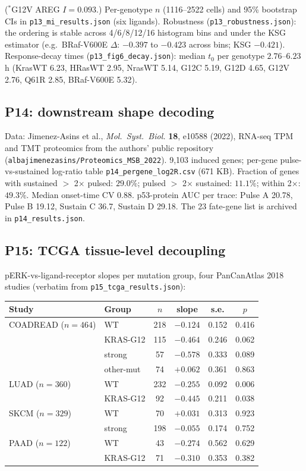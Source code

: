 \documentclass[11pt]{article}
\begin{document}
($^*$G12V AREG $I=0.093$.) Per-genotype $n$ (1116--2522 cells) and 95\%
bootstrap CIs in \texttt{p13\_mi\_results.json} (six ligands).
Robustness (\texttt{p13\_robustness.json}): the ordering is stable across
4/6/8/12/16 histogram bins and under the KSG estimator (e.g.\ BRaf-V600E
$\Delta$: $-0.397$ to $-0.423$ across bins; KSG $-0.421$).
Response-decay times (\texttt{p13\_fig6\_decay.json}): median $t_0$ per
genotype $2.76$--$6.23$ h (KrasWT 6.23, HRasWT 2.95, NrasWT 5.14, G12C
5.19, G12D 4.65, G12V 2.76, Q61R 2.85, BRaf-V600E 5.32).

\subsection{P14: downstream shape decoding}

Data: Jimenez-Asins et al., \textit{Mol.\ Syst.\ Biol.} \textbf{18},
e10588 (2022), RNA-seq TPM and TMT proteomics from the authors' public
repository (\texttt{albajimenezasins/Proteomics\_MSB\_2022}).
9{,}103 induced genes; per-gene pulse-vs-sustained log-ratio table
\texttt{p14\_pergene\_log2R.csv} (671 KB). Fraction of genes with
sustained $>$ 2$\times$ pulsed: $29.0\%$; pulsed $>$ 2$\times$
sustained: $11.1\%$; within 2$\times$: $49.3\%$. Median onset-time CV
$0.88$. p53-protein AUC per trace: Pulse A 20.78, Pulse B 19.12, Sustain
C 36.7, Sustain D 29.18. The 23 fate-gene list is archived in
\texttt{p14\_results.json}.

\subsection{P15: TCGA tissue-level decoupling}

pERK-vs-ligand-receptor slopes per mutation group, four PanCanAtlas 2018
studies (verbatim from \texttt{p15\_tcga\_results.json}):

\begin{table}[h]
\centering\footnotesize
\begin{tabular}{llcccc}
\toprule
Study & Group & $n$ & slope & s.e. & $p$ \\
\midrule
COADREAD ($n{=}464$) & WT & 218 & $-0.124$ & 0.152 & 0.416 \\
 & KRAS-G12 & 115 & $-0.464$ & 0.246 & 0.062 \\
 & strong & 57 & $-0.578$ & 0.333 & 0.089 \\
 & other-mut & 74 & $+0.062$ & 0.361 & 0.863 \\
LUAD ($n{=}360$) & WT & 232 & $-0.255$ & 0.092 & 0.006 \\
 & KRAS-G12 & 92 & $-0.445$ & 0.211 & 0.038 \\
SKCM ($n{=}329$) & WT & 70 & $+0.031$ & 0.313 & 0.923 \\
 & strong & 198 & $-0.055$ & 0.174 & 0.752 \\
PAAD ($n{=}122$) & WT & 43 & $-0.274$ & 0.562 & 0.629 \\
 & KRAS-G12 & 71 & $-0.310$ & 0.353 & 0.382 \\
\bottomrule
\end{tabular}
\end{table}
\end{document}
